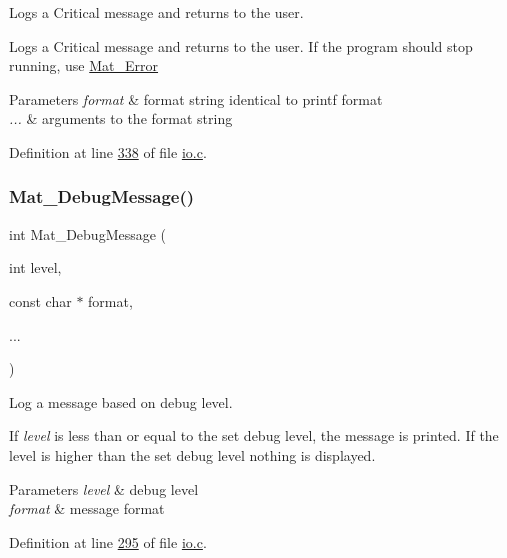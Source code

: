 Logs a Critical message and returns to the user. 

Logs a Critical message and returns to the user. If the program should stop running, use \hyperlink{group__mat__util_ga058b1cb9a4ca36712857d2b3c4de7ffc}{Mat\+\_\+\+Error}


\begin{DoxyParams}{Parameters}
{\em format} & format string identical to printf format \\
\hline
{\em ...} & arguments to the format string \\
\hline
\end{DoxyParams}


Definition at line \hyperlink{io_8c_source_l00338}{338} of file \hyperlink{io_8c_source}{io.\+c}.

\mbox{\label{group__mat__util_ga26e00cfb07551be5201fd9e0f04066d9}} 
\subsubsection{\texorpdfstring{Mat\+\_\+\+Debug\+Message()}{Mat\_DebugMessage()}}
{\footnotesize\ttfamily int Mat\+\_\+\+Debug\+Message (\begin{DoxyParamCaption}\item[{int}]{level,  }\item[{const char $\ast$}]{format,  }\item[{}]{... }\end{DoxyParamCaption})}



Log a message based on debug level. 

If {\itshape level} is less than or equal to the set debug level, the message is printed. If the level is higher than the set debug level nothing is displayed.


\begin{DoxyParams}{Parameters}
{\em level} & debug level \\
\hline
{\em format} & message format \\
\hline
\end{DoxyParams}


Definition at line \hyperlink{io_8c_source_l00295}{295} of file \hyperlink{io_8c_source}{io.\+c}.

